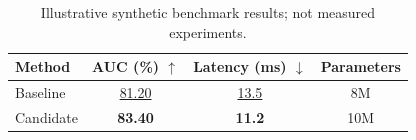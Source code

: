 \documentclass[10pt]{article}
\begin{document}
\begin{table}[t]
\centering
\caption{Illustrative synthetic benchmark results; not measured experiments.}
\label{tab:benchmark}
\begin{tabular}{@{}lccc@{}}
\toprule
Method & AUC (\%) $\uparrow$ & Latency (ms) $\downarrow$ & Parameters \\
\midrule
Baseline & \underline{81.20} & \underline{13.5} & 8M \\
Candidate & \textbf{83.40} & \textbf{11.2} & 10M \\
\bottomrule
\end{tabular}
\end{table}
\end{document}
